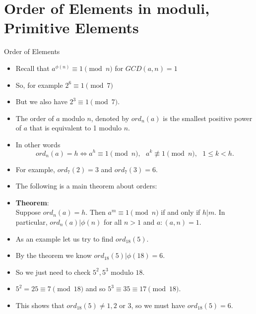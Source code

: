 \documentclass[ %
 usenames,dvipsnames,
aspectratio=169,11pt ]{beamer}
\newenvironment{stepitemize}{\begin{itemize}[<+->]}{\end{itemize} }
\begin{document}
\section{Order of Elements in moduli, Primitive Elements}
\begin{frame}{Order of Elements}
    \begin{stepitemize}
    \item Recall that $a^{\phi(n)} \equiv 1 \pmod{n}$ for $GCD(a,n)=1$
    \item So, for example $2^6\equiv 1 \pmod{7}$
    \item But we also have $2^3\equiv 1 \pmod{7}$.
    \item The order of $a$ modulo $n$, denoted by $ord_n(a)$ is the smallest positive power of $a$ that is equivalent to 1 modulo $n$.
    \item In other words
    $$ord_n(a)=h \Leftrightarrow a^h \equiv 1 \pmod{n}, \:\:\: a^k\not \equiv 1 \pmod{n}, \:\:\:  1\leq k < h.$$
    \item For example, $ord_7(2)=3$ and $ord_7(3)=6$.
    \item The following is a main theorem about orders:
    \item {\bf Theorem}:\\
Suppose $ord_n(a)=h$. Then $a^m\equiv 1 \pmod{n}$ if and only if $h|m$. In particular, $ord_n(a)|\phi(n)$ for all $n>1$ and $a: (a,n)=1$.
    \end{stepitemize}
\end{frame}
\begin{frame}
\begin{stepitemize}
\item As an example let us try to find $ord_{18}(5)$.
\item By the theorem we know $ord_{18}(5)|\phi(18)=6$.
\item So we just need to check $5^2, 5^3$ modulo $18$.
\item $5^2=25 \equiv 7 \pmod{18}$ and so $5^3 \equiv 35 \equiv 17 \pmod{18}$.
\item This shows that $ord_{18}(5)\neq 1, 2$ or $3$, so we must have $ord_{18}(5)=6$.
\end{stepitemize}
\end{frame}
\end{document}
